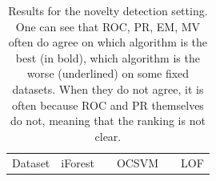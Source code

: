 \documentclass[10pt]{beamer}
\begin{document}
\begin{frame}
\begin{table}[!ht]
\centering
\footnotesize
\caption{\footnotesize Results for the novelty detection setting. One can see that ROC, PR, EM, MV often do agree on which algorithm is the best (in bold), which algorithm is the worse (underlined) on some fixed datasets. When they do not agree, it is often because ROC and PR themselves do not, meaning that the ranking is not clear.}
\tabcolsep=0.11cm
\resizebox{\linewidth}{!} {
\begin{tabular}{l cccc c cccc c cccc}
\toprule
Dataset      & \multicolumn{4}{c}{iForest}& & \multicolumn{4}{c}{OCSVM}&  & \multicolumn{4}{c}{LOF} \\ %
  \cmidrule{1-15}


\end{tabular}}
\end{table}
\end{frame}
\end{document}
